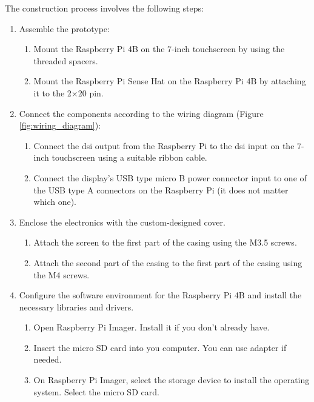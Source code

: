 \documentclass[../main.tex]{subfiles}
\begin{document}
    The construction process involves the following steps:

    \begin{enumerate}
        \item Assemble the prototype:
        \begin{enumerate}
            \item Mount the Raspberry Pi 4B on the 7-inch touchscreen by using the threaded spacers.
            \item Mount the Raspberry Pi Sense Hat on the Raspberry Pi 4B by attaching it to the 2$\times$20 pin.
        \end{enumerate}
        
        \item Connect the components according to the wiring diagram (Figure \ref{fig:wiring_diagram}):
        \begin{enumerate}
            \item Connect the \gls{dsi} output from the Raspberry Pi to the \gls{dsi} input on the 7-inch touchscreen using a suitable ribbon cable.
            \item Connect the display's USB type micro B power connector input to one of the USB type A connectors on the Raspberry Pi (it does not matter which one).
        \end{enumerate}

        \item Enclose the electronics with the custom-designed cover.
        \begin{enumerate}
            \item Attach the screen to the first part of the casing using the M3.5 screws.
            \item{Attach the second part of the casing to the first part of the casing using the M4 screws.}
        \end{enumerate}
        
        \item Configure the software environment for the Raspberry Pi 4B and install the necessary libraries and drivers.
        \begin{enumerate}
            \item Open Raspberry Pi Imager. Install it if you don't already have.
            
            \item Insert the micro SD card into you computer. You can use adapter if needed.
            
            \item On Raspberry Pi Imager, select the storage device to install the operating system. Select the micro SD card.
            

\end{enumerate}
\end{enumerate}
\end{document}
